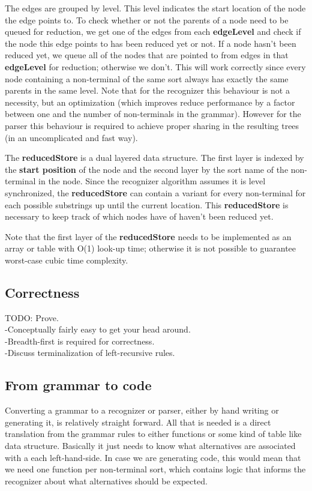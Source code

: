 \documentclass[a4paper,10pt]{article}
\begin{document}
The edges are grouped by level. This level indicates the start location of the node the edge points to. To check whether or not the parents of a node need to be queued for reduction, we get one of the edges from each {\bf edgeLevel} and check if the node this edge points to has been reduced yet or not. If a node hasn't been reduced yet, we queue all of the nodes that are pointed to from edges in that {\bf edgeLevel} for reduction; otherwise we don't. This will work correctly since every node containing a non-terminal of the same sort always has exactly the same parents in the same level. Note that for the recognizer this behaviour is not a necessity, but an optimization (which improves reduce performance by a factor between one and the number of non-terminals in the grammar). However for the parser this behaviour is required to achieve proper sharing in the resulting trees (in an uncomplicated and fast way).

The {\bf reducedStore} is a dual layered data structure. The first layer is indexed by the {\bf start position} of the node and the second layer by the sort name of the non-terminal in the node. Since the recognizer algorithm assumes it is level synchronized, the {\bf reducedStore} can contain a variant for every non-terminal for each possible substrings up until the current location. This {\bf reducedStore} is necessary to keep track of which nodes have of haven't been reduced yet.

Note that the first layer of the {\bf reducedStore} needs to be implemented as an array or table with O(1) look-up time; otherwise it is not possible to guarantee worst-case cubic time complexity.

\subsection{Correctness}

TODO: Prove.\\
-Conceptually fairly easy to get your head around.\\
-Breadth-first is required for correctness.\\
-Discuss terminalization of left-recursive rules.

\subsection{From grammar to code}

Converting a grammar to a recognizer or parser, either by hand writing or generating it, is relatively straight forward. All that is needed is a direct translation from the grammar rules to either functions or some kind of table like data structure. Basically it just needs to know what alternatives are associated with a each left-hand-side. In case we are generating code, this would mean that we need one function per non-terminal sort, which contains logic that informs the recognizer about what alternatives should be expected.
\end{document}

